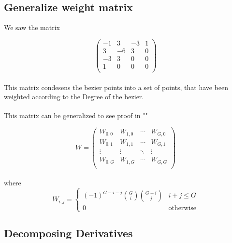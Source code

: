 \subsection{Generalize weight matrix}

We saw the matrix

\begin{equation*}
    \left(
    \begin{array}{cccc}
        -1 & 3  & -3 & 1 \\
        3  & -6 & 3  & 0 \\
        -3 & 3  & 0  & 0 \\
        1  & 0  & 0  & 0 \\
    \end{array}
    \right)
\end{equation*}
\\
This matrix condesens the bezier points into a set of points, that have been weighted according to the Degree of the bezier.
\\
\\
This matrix can be generalized to see proof in ""

\begin{equation*}
    W=
    \left(
    \begin{array}{cccc}
        W_{0,0} & W_{1,0} & \cdots & W_{G,0} \\
        W_{0,1} & W_{1,1} & \cdots & W_{G,1} \\
        \vdots  & \vdots  & \ddots & \vdots  \\
        W_{0,G} & W_{1,G} & \cdots & W_{G,G} \\
    \end{array}
    \right)
\end{equation*}
\\
where
\\
\begin{equation*}
    W_{i,j}=\begin{cases}
        (-1)^{G-i-j} {G \choose i}{G-i \choose j} & i + j \le G      \\
        0                                         & \text{otherwise}
    \end{cases}
\end{equation*}

\subsection{Decomposing Derivatives}

